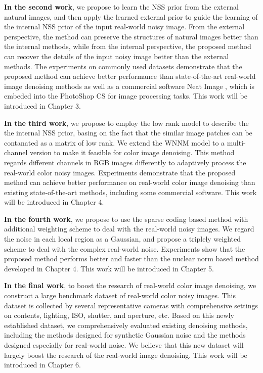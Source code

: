 \textbf{In the second work}, we propose to learn the NSS prior from the external natural images, and then apply the learned external prior to guide the learning of the internal NSS prior of the input real-world noisy image. From the external perspective, the method can preserve the structures of natural images better than the internal methods, while from the internal perspective, the proposed method can recover the details of the input noisy image better than the external methods. The experiments on commonly used datasets demonstrate that the proposed method can achieve better performance than state-of-the-art real-world image denoising methods as well as a commercial software Neat Image \cite{neatimage}, which is embeded into the PhotoShop CS for image processing tasks. This work will be introduced in Chapter 3.


\textbf{In the third work}, we propose to employ the low rank model to describe the the internal NSS prior, basing on the fact that the similar image patches can be contanated as a matrix of low rank. We extend the WNNM model \cite{wnnm} to a multi-channel version to make it feasible for color image denoising. This method regards different channels in RGB images differently to adaptively process the real-world color noisy images. Experiments demonstrate that the proposed method can achieve better performance on real-world color image denoising than existing state-of-the-art methods, including some commercial software. This work will be introduced in Chapter 4.


\textbf{In the fourth work}, we propose to use the sparse coding based method with additional weighting scheme to deal with the real-world noisy images. We regard the noise in each local region as a Gaussian, and propose a triplely weighted scheme to deal with the complex real-world noise. Experiments show that the proposed method performs better and faster than the nuclear norm based method developed in Chapter 4. This work will be introduced in Chapter 5.


\textbf{In the final work}, to boost the research of real-world color image denoising, we construct a large benchmark dataset of real-world color noisy images. This dataset is collected by several representative cameras with comprehensive settings on contents, lighting, ISO, shutter, and aperture, etc. Based on this newly established dataset, we comprehensively evaluated existing denoising methods, including the methods designed for synthetic Gaussian noise and the methods designed especially for real-world noise. We believe that this new dataset will largely boost the research of the real-world image denoising. This work will be introduced in Chapter 6.


